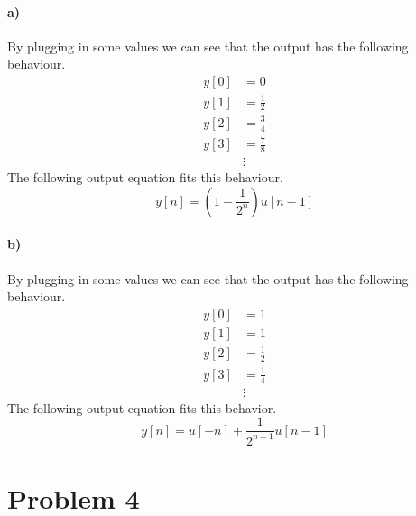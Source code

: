 \documentclass[12pt]{article}
\begin{document}
\paragraph{a)}

By plugging in some values we can see that the output has the following behaviour.
\begin{align*}
    y[0] &= 0\\
    y[1] &= \frac{1}{2}\\
    y[2] &= \frac{3}{4}\\
    y[3] &= \frac{7}{8}\\
    &\vdots
\end{align*}
The following output equation fits this behaviour.
\[y[n] = \left(1-\frac{1}{2^n}\right)u[n-1]\]

\paragraph{b)}

By plugging in some values we can see that the output has the following behaviour.
\begin{align*}
    y[0] &= 1\\
    y[1] &= 1\\
    y[2] &= \frac{1}{2}\\
    y[3] &= \frac{1}{4}\\
    &\vdots
\end{align*}
The following output equation fits this behavior.
\[y[n] = u[-n] + \frac{1}{2^{n-1}}u[n-1]\]

\section*{Problem 4}
\end{document}
